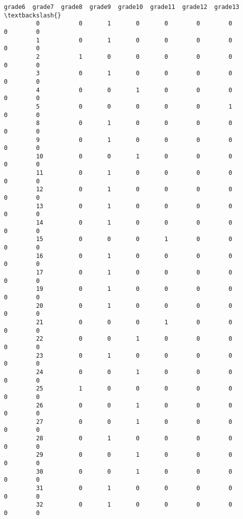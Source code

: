 \documentclass[11pt]{article}
\begin{document}
\begin{Verbatim}[commandchars=\\\{\}]
                grade6  grade7  grade8  grade9  grade10  grade11  grade12  grade13  \textbackslash{}
         0           0       1       0       0        0        0        0        0   
         1           0       1       0       0        0        0        0        0   
         2           1       0       0       0        0        0        0        0   
         3           0       1       0       0        0        0        0        0   
         4           0       0       1       0        0        0        0        0   
         5           0       0       0       0        0        1        0        0   
         8           0       1       0       0        0        0        0        0   
         9           0       1       0       0        0        0        0        0   
         10          0       0       1       0        0        0        0        0   
         11          0       1       0       0        0        0        0        0   
         12          0       1       0       0        0        0        0        0   
         13          0       1       0       0        0        0        0        0   
         14          0       1       0       0        0        0        0        0   
         15          0       0       0       1        0        0        0        0   
         16          0       1       0       0        0        0        0        0   
         17          0       1       0       0        0        0        0        0   
         19          0       1       0       0        0        0        0        0   
         20          0       1       0       0        0        0        0        0   
         21          0       0       0       1        0        0        0        0   
         22          0       0       1       0        0        0        0        0   
         23          0       1       0       0        0        0        0        0   
         24          0       0       1       0        0        0        0        0   
         25          1       0       0       0        0        0        0        0   
         26          0       0       1       0        0        0        0        0   
         27          0       0       1       0        0        0        0        0   
         28          0       1       0       0        0        0        0        0   
         29          0       0       1       0        0        0        0        0   
         30          0       0       1       0        0        0        0        0   
         31          0       1       0       0        0        0        0        0   
         32          0       1       0       0        0        0        0        0   

\end{Verbatim}
\end{document}

